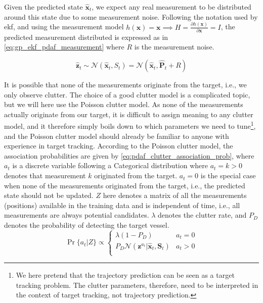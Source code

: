 Given the predicted state $\hat{\boldsymbol{x}}_t$, we expect any real measurement to be distributed around this state due to some measurement noise. Following the notation used by \acrshort{ekf}, and using the measurement model $h(\boldsymbol{x}) = \boldsymbol{x} \implies H = \frac{\partial h (\boldsymbol{x})}{\partial \boldsymbol{x}} = I$, the predicted measurement distributed is expressed as in \cref{eq:gp_ekf_pdaf_measurement} where $R$ is the measurement noise.

\begin{equation} \label{eq:gp_ekf_pdaf_measurement}
    \hat{\boldsymbol{z}}_t \sim \mathcal{N}(\hat{\boldsymbol{x}}_t, S_{t}) = \mathcal{N}(\hat{\boldsymbol{x}}_t, \hat{\boldsymbol{P}}_t + R)
\end{equation}

It is possible that none of the measurements originate from the target, i.e., we only observe clutter. The choice of a good clutter model is a complicated topic, but we will here use the Poisson clutter model. As none of the measurements actually originate from our target, it is difficult to assign meaning to any clutter model, and it therefore simply boils down to which parameters we need to tune\footnote{We here pretend that the trajectory prediction can be seen as a target tracking problem. The clutter parameters, therefore, need to be interpreted in the context of target tracking, not trajectory prediction.}, and the Poisson clutter model should already be familiar to anyone with experience in target tracking.
According to the Poisson clutter model, the association probabilities are given by \cref{eq:pdaf_clutter_association_prob}, where $a_t$ is a discrete variable following a Categorical distribution where $a_t=k > 0$ denotes that measurement $k$ originated from the target. $a_t = 0$ is the special case when none of the measurements originated from the target, i.e., the predicted state should not be updated. $Z$ here denotes a matrix of all the measurements (positions) available in the training data and is independent of time, i.e., all measurements are always potential candidates. $\lambda$ denotes the clutter rate, and $P_D$ denotes the probability of detecting the target vessel.
\begin{equation}\label{eq:pdaf_clutter_association_prob}
    \Pr\{a_t | Z\} \propto \begin{cases}
        \lambda (1 - P_D) &  a_t = 0\\
        P_D \mathcal{N} (\boldsymbol{z}^{a_t} | \hat{\boldsymbol{x}}_t, \boldsymbol{S}_t) & a_t > 0\\
    \end{cases}
\end{equation}


